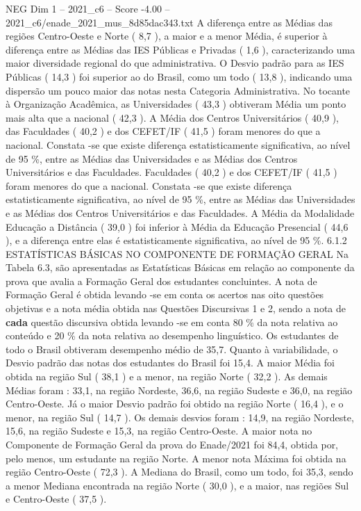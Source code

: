 \begin{textsample}{NEG Dim 1 – 2021\_c6 – Score -4.00 – 2021\_c6/enade\_2021\_mus\_8d85dac343.txt}
A diferença entre as Médias das regiões Centro-Oeste e Norte ( 8,7 ), a maior e a menor Média, é superior à diferença entre as Médias das IES Públicas e Privadas ( 1,6 ), caracterizando uma maior diversidade regional do que administrativa.
O Desvio padrão para as IES Públicas ( 14,3 ) foi superior ao do Brasil, como um todo ( 13,8 ), indicando uma dispersão um pouco maior das notas nesta Categoria Administrativa.
No tocante à Organização Acadêmica, as Universidades ( 43,3 ) obtiveram Média um ponto mais alta que a nacional ( 42,3 ).
A Média dos Centros Universitários ( 40,9 ), das Faculdades ( 40,2 ) e dos CEFET/IF ( 41,5 ) foram menores do que a nacional.
Constata -se que existe diferença estatisticamente significativa, ao nível de 95 \%, entre as Médias das Universidades e as Médias dos Centros Universitários e das Faculdades.
Faculdades ( 40,2 ) e dos CEFET/IF ( 41,5 ) foram menores do que a nacional.
Constata -se que existe diferença estatisticamente significativa, ao nível de 95 \%, entre as Médias das Universidades e as Médias dos Centros Universitários e das Faculdades.
A Média da Modalidade Educação a Distância ( 39,0 ) foi inferior à Média da Educação Presencial ( 44,6 ), e a diferença entre elas é estatisticamente significativa, ao nível de 95 \%. 6.1.2 ESTATÍSTICAS BÁSICAS NO COMPONENTE DE FORMAÇÃO GERAL Na Tabela 6.3, são apresentadas as Estatísticas Básicas em relação ao componente da prova que avalia a Formação Geral dos estudantes concluintes.
A nota de Formação Geral é obtida levando -se em conta os acertos nas oito questões objetivas e a nota média obtida nas Questões Discursivas 1 e 2, sendo a nota de \textbf{cada} questão discursiva obtida levando -se em conta 80 \% da nota relativa ao conteúdo e 20 \% da nota relativa ao desempenho linguístico.
Os estudantes de todo o Brasil obtiveram desempenho médio de 35,7.
Quanto à variabilidade, o Desvio padrão das notas dos estudantes do Brasil foi 15,4.
A maior Média foi obtida na região Sul ( 38,1 ) e a menor, na região Norte ( 32,2 ).
As demais Médias foram : 33,1, na região Nordeste, 36,6, na região Sudeste e 36,0, na região Centro-Oeste.
Já o maior Desvio padrão foi obtido na região Norte ( 16,4 ), e o menor, na região Sul ( 14,7 ).
Os demais desvios foram : 14,9, na região Nordeste, 15,6, na região Sudeste e 15,3, na região Centro-Oeste.
A maior nota no Componente de Formação Geral da prova do Enade/2021 foi 84,4, obtida por, pelo menos, um estudante na região Norte.
A menor nota Máxima foi obtida na região Centro-Oeste ( 72,3 ).
A Mediana do Brasil, como um todo, foi 35,3, sendo a menor Mediana encontrada na região Norte ( 30,0 ), e a maior, nas regiões Sul e Centro-Oeste ( 37,5 ).

\end{textsample}
